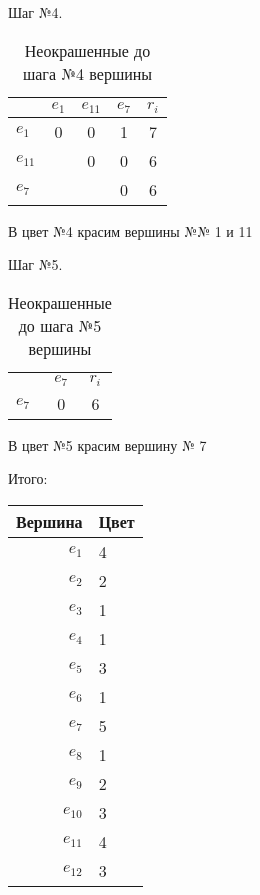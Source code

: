 \documentclass[a4paper,12pt]{article}
\begin{document}
\bigskip
\noindent\begin{minipage}[0cm]{\textwidth}
    Шаг №4.
    \begin{table}[H]
        \raggedright
        \caption{Неокрашенные до шага №4 вершины}
        \begin{tabular}{l|*{3}{c}|c}
                & $e_1$ & $e_{11}$ & $e_7$ & $r_i$ \\ \hline
        $e_{ 1}$ &    0 &       0  &    1  &     7 \\
        $e_{11}$ &      &       0  &    0  &     6 \\
        $e_{ 7}$ &      &          &    0  &     6 \\
        \end{tabular}
    \end{table}
    В цвет №4 красим вершины №№ 1 и 11
\end{minipage}

\bigskip
\noindent\begin{minipage}[0cm]{\textwidth}
    Шаг №5.
    \begin{table}[H]
        \caption{Неокрашенные до шага №5 вершины}
        \begin{tabular}{l|*{1}{c}|c}
        &$e_7$&$r_i$ \\
        $e_7$&0&6 \\
        \end{tabular}
    \end{table}
    В цвет №5 красим вершину № 7
\end{minipage}

\bigskip
\noindent\begin{minipage}[0cm]{\textwidth}
    Итого:
    \begin{table}[H]
        \begin{tabular}{r|l}
            Вершина  & Цвет \\ \hline
            $e_{ 1}$ &    4 \\
            $e_{ 2}$ &    2 \\
            $e_{ 3}$ &    1 \\
            $e_{ 4}$ &    1 \\
            $e_{ 5}$ &    3 \\
            $e_{ 6}$ &    1 \\
            $e_{ 7}$ &    5 \\
            $e_{ 8}$ &    1 \\
            $e_{ 9}$ &    2 \\
            $e_{10}$ &    3 \\
            $e_{11}$ &    4 \\
            $e_{12}$ &    3 \\
        \end{tabular}
    \end{table}
\end{minipage}
\end{document}
